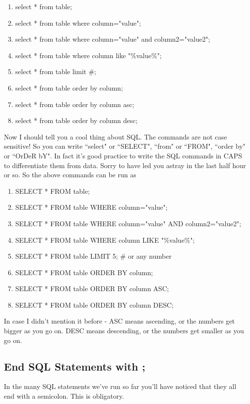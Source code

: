 \documentclass[12pt,a4paper]{article}
\begin{document}
\begin{enumerate}
\item select * from table;
\item select * from table where column="value";
\item select * from table where column="value" and column2="value2";
\item select * from table where column like "\%value\%";
\item select * from table limit \#;
\item select * from table order by column;
\item select * from table order by column asc;
\item select * from table order by column desc;
\end{enumerate}

Now I should tell you a cool thing about SQL. The commands are not case
sensitive! So you can write ``select" or ``SELECT", ``from" or ``FROM", ``order by" or ``OrDeR
bY". In fact it's good practice to write the SQL commands in CAPS to
differentiate them from data. Sorry to have led you astray in the last half hour
or so. So the above commands can be run as 

\begin{enumerate}
\item SELECT * FROM table;
\item SELECT * FROM table WHERE column="value";
\item SELECT * FROM table WHERE column="value" AND column2="value2";
\item SELECT * FROM table WHERE column LIKE "\%value\%";
\item SELECT * FROM table LIMIT 5; \# or any number
\item SELECT * FROM table ORDER BY column;
\item SELECT * FROM table ORDER BY column ASC;
\item SELECT * FROM table ORDER BY column DESC;
\end{enumerate}

In case I didn't mention it before - ASC means ascending, or the numbers get
bigger as you go on. DESC means descending, or the numbers get smaller as you go
on.

\subsection{End SQL Statements with ;}
In the many SQL statements we've run so far you'll have noticed that they all
end with a semicolon. This is obligatory. 
\end{document}
